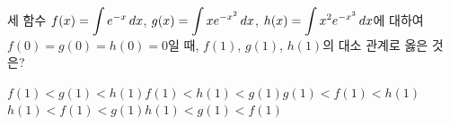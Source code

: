 \hspace*{2mm}\begin{minipage}[t]{\dimexpr\linewidth-2mm\relax}\vspace{0pt}
세 함수 $f(x)=\displaystyle\int e^{-x}\mkern3mu dx$, $g(x)=\displaystyle\int xe^{-x^2}\mkern3mu dx$, $h(x)=\displaystyle\int x^2e^{-x^3}\mkern3mu dx$에 대하여 $f(0)=g(0)=h(0)=0$일 때, $f(1)$, $g(1)$, $h(1)$의 대소 관계로 옳은 것은?
\begin{choicesv}{$f(1)<g(1)<h(1)$}{$f(1)<h(1)<g(1)$}{$g(1)<f(1)<h(1)$}{$h(1)<f(1)<g(1)$}{$h(1)<g(1)<f(1)$}\end{choicesv}\end{minipage}
